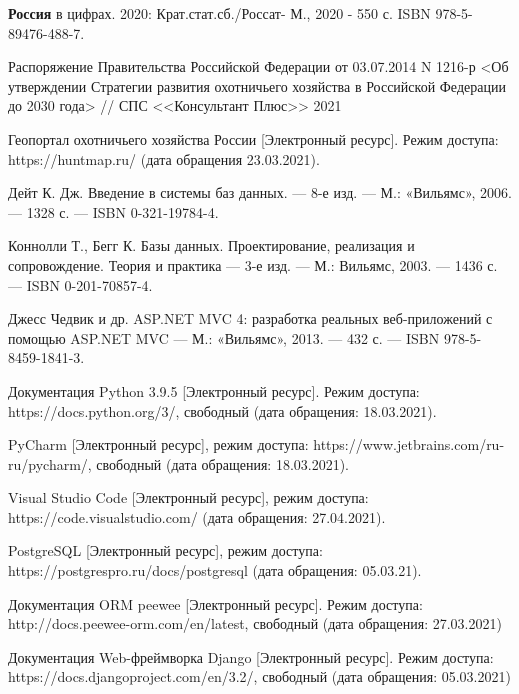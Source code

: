 \newpage
	\begin{thebibliography}{9} 
		
		 \textbf{Россия} в цифрах. 2020: Крат.стат.сб./Россат- М., 2020 - 550 с. ISBN 978-5-89476-488-7.
		
		 Распоряжение Правительства Российской Федерации от 03.07.2014 N 1216-р <Об утверждении Стратегии развития охотничьего хозяйства в Российской Федерации до 2030 года> // СПС <<Консультант Плюс>> 2021 
		
		 Геопортал охотничьего хозяйства России [Электронный ресурс]. Режим доступа: https://huntmap.ru/ (дата обращения 23.03.2021).
		
		 Дейт К. Дж. Введение в системы баз данных. — 8-е изд. — М.: «Вильямс», 2006. — 1328 с. — ISBN 0-321-19784-4.
		
		 Коннолли Т., Бегг К. Базы данных. Проектирование, реализация и сопровождение. Теория и практика — 3-е изд. — М.: Вильямс, 2003. — 1436 с. — ISBN 0-201-70857-4.
		
		 Джесс Чедвик и др. ASP.NET MVC 4: разработка реальных веб-приложений с помощью ASP.NET MVC — М.: «Вильямс», 2013. — 432 с. — ISBN 978-5-8459-1841-3.
		
		 Документация Python 3.9.5 [Электронный ресурс]. Режим доступа: https://docs.python.org/3/, свободный (дата обращения:
		18.03.2021).

		
		 PyCharm [Электронный ресурс], режим доступа: https://www.jetbrains.com/ru-ru/pycharm/, свободный (дата обращения:
		18.03.2021).
		
		 Visual Studio Code [Электронный ресурс], режим доступа: https://code.visualstudio.com/ (дата обращения: 27.04.2021).
		
		 PostgreSQL [Электронный ресурс], режим доступа: https://postgrespro.ru/docs/postgresql (дата обращения: 05.03.21).
		
		 Документация ORM peewee [Электронный ресурс]. Режим доступа: http://docs.peewee-orm.com/en/latest, свободный (дата обращения: 27.03.2021)
		
		 Документация Web-фреймворка Django [Электронный ресурс].
		Режим доступа: https://docs.djangoproject.com/en/3.2/, свободный (дата обращения: 05.03.2021)
		
		
		
	\end{thebibliography}